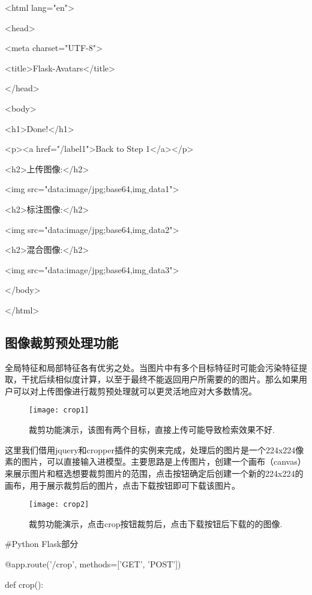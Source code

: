 \documentclass[bachelor_p]{hdu-thesis}
\begin{document}
<html lang="en">

<head>

<meta charset="UTF-8">

<title>Flask-Avatars</title>

</head>

<body>

<h1>Done!</h1>

<p><a href="/label1">Back to Step 1</a></p>

<h2>上传图像:</h2>

<img src="data:image/jpg;base64,{{img$\_$data1}}">

<h2>标注图像:</h2>

<img src="data:image/jpg;base64,{{img$\_$data2}}">

<h2>混合图像:</h2>

<img src="data:image/jpg;base64,{{img$\_$data3}}">

</body>

</html>

\subsection {图像裁剪预处理功能}

全局特征和局部特征各有优劣之处。当图片中有多个目标特征时可能会污染特征提取，干扰后续相似度计算，以至于最终不能返回用户所需要的的图片。那么如果用户可以对上传图像进行裁剪预处理就可以更灵活地应对大多数情况。

\begin{figure}[!htb]
  \centering
  \texttt{[image: crop1]}
  \caption{裁剪功能演示，该图有两个目标，直接上传可能导致检索效果不好.}
  \label{fig_crop1}
\end{figure}

这里我们借用jquery和cropper插件的实例来完成，处理后的图片是一个224x224像素的图片，可以直接输入进模型。主要思路是上传图片，创建一个画布（canvas）来展示图片和框选想要裁剪图片的范围，点击按钮确定后创建一个新的224x224的画布，用于展示裁剪后的图片，点击下载按钮即可下载该图片。

\begin{figure}[!htb]
  \centering
  \texttt{[image: crop2]}
  \caption{裁剪功能演示，点击crop按钮裁剪后，点击下载按钮后下载的的图像.}
  \label{fig_crop2}
\end{figure}

$\#$Python Flask部分

@app.route('/crop', methods=['GET', 'POST'])

def crop():
\end{document}
